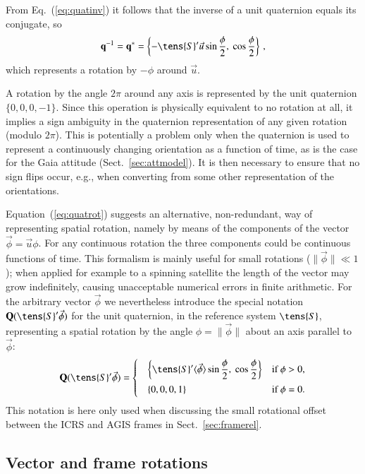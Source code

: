 \documentclass[structabstract]{aa}
\newcommand{\quat}[1]{\mathbf{#1}}
\begin{document}
From Eq.~(\ref{eq:quatinv}) it follows that the inverse of a unit
quaternion equals its conjugate, so
\begin{equation}\label{eq:quatrotinv}
\quat{q}^{-1}=\quat{q}^*
=\left\{-\tens{S}'\vec{u}\sin\frac{\phi}{2},~\cos\frac{\phi}{2}\right\} \, ,
\end{equation}
which represents a rotation by $-\phi$ around $\vec{u}$.

A rotation by the angle $2\pi$ around any axis is represented by the unit
quaternion $\bigl\{0,0,0,-1\bigr\}$. Since this operation is physically equivalent 
to no rotation at all, it implies a sign ambiguity in the quaternion representation
of any given rotation (modulo $2\pi$). This is potentially a problem only when
the quaternion is used to represent a continuously changing orientation as a
function of time, as is the case for the Gaia attitude (Sect.~\ref{sec:attmodel}).
It is then necessary to ensure that no sign flips occur, e.g., when converting
from some other representation of the orientations.

Equation~(\ref{eq:quatrot}) suggests an alternative, non-redundant, way 
of representing spatial rotation, namely by means of the components of
the vector $\vec{\phi}=\vec{u}\phi$. For any continuous 
rotation the three components could be continuous functions of time.
This formalism is mainly useful for small rotations
($\|\vec{\phi}\|\ll 1$);
when applied for example to a spinning satellite the length of the vector 
may grow indefinitely, causing unacceptable numerical errors in finite 
arithmetic. For the arbitrary vector $\vec{\phi}$ we nevertheless
introduce the special notation $\quat{Q}(\tens{S}'\vec{\phi})$ for the 
unit quaternion, in the reference system $\tens{S}$, representing a 
spatial rotation by the angle $\phi=\|\vec{\phi}\|$ about an axis parallel 
to $\vec{\phi}$:
\begin{equation}\label{eq:qrot}
\quat{Q}(\tens{S}'\vec{\phi}) = 
\begin{cases} \quad\displaystyle\left\{ \tens{S}'\langle\vec{\phi}\rangle
\sin\frac{\phi}{2},~\cos\frac{\phi}{2}\right\}
&\text{if $\phi>0$,}\\[6pt]
\quad\displaystyle\left\{0,0,0,1\right\} &\text{if $\phi=0$.}
\end{cases}
\end{equation} 
This notation is here only used when discussing the small rotational 
offset between the ICRS and AGIS frames in Sect.~\ref{sec:framerel}.


\subsection{Vector and frame rotations}\label{sec:vecframe}
\end{document}

